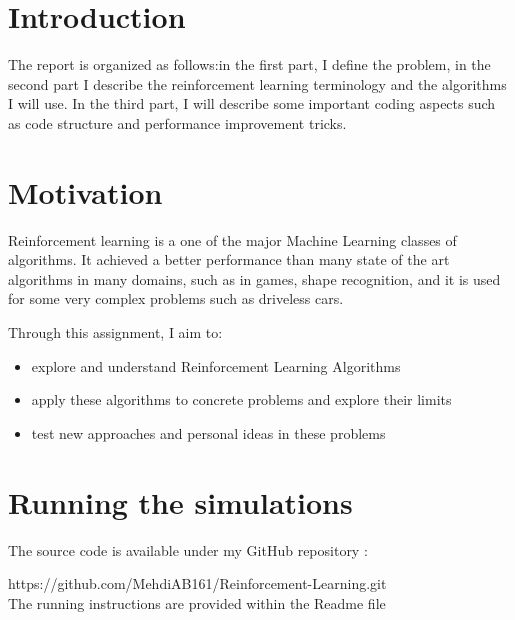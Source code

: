 \documentclass[12pt,a4paper]{article}
\begin{document}
\newpage
\tableofcontents


\newpage

\section*{Introduction}

The report is organized as follows:in the first part, I define the problem, in the second part I describe the reinforcement learning terminology and the algorithms I will use. In the third part, I will describe some important coding aspects such as code structure and performance improvement tricks.

\section*{Motivation}
Reinforcement learning is a one of the major Machine Learning classes of algorithms. It achieved a better performance than many state of the art algorithms in many domains, such as in games\cite{mnih-dqn-2015}\cite{44806}, shape recognition\cite{DBLP:journals/corr/RezendeEMBJH16}, and it is used for some very complex problems such as driveless cars.

Through this assignment, I aim to:
\begin{itemize}
\item explore and understand Reinforcement Learning Algorithms
\item apply these algorithms to concrete problems and explore their limits
\item test new approaches and personal ideas in these problems
 \end{itemize}

\section*{Running the simulations}
The source code is available under my GitHub repository :

https://github.com/MehdiAB161/Reinforcement-Learning.git
\\The running instructions are provided within the Readme file


\end{document}
